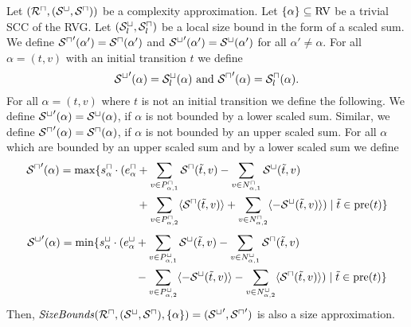 \begin{theorem}
  Let $({\mathcal{R}^\sqcap}, {({\mathcal{S}^\sqcup}, {\mathcal{S}^\sqcap})})$ be a complexity approximation.
  Let $\lbrace \alpha \rbrace \subseteq \text{RV}$ be a trivial SCC of the RVG.
  Let ${({\mathcal{S}^\sqcup_l}, {\mathcal{S}^\sqcap_l})}$ be a local size bound in the form of a scaled sum.
  We define ${\mathcal{S}^\sqcap}'(\alpha') = {\mathcal{S}^\sqcap}(\alpha')$ and ${\mathcal{S}^\sqcup}'(\alpha') = {\mathcal{S}^\sqcup}(\alpha')$ for all $\alpha' \neq \alpha$.
  For all $\alpha = (t, v)$ with an initial transition $t$ we define
  \[ {\mathcal{S}^\sqcup}'(\alpha) = {\mathcal{S}^\sqcup_l}(\alpha) \text{ and } {\mathcal{S}^\sqcap}'(\alpha) = {\mathcal{S}^\sqcap_l}(\alpha). \]
  For all $\alpha = (t, v)$ where $t$ is not an initial transition we define the following.
  We define ${\mathcal{S}^\sqcup}'(\alpha) = {\mathcal{S}^\sqcup}(\alpha)$, if $\alpha$ is not bounded by a lower scaled sum.
  Similar, we define ${\mathcal{S}^\sqcap}'(\alpha) = {\mathcal{S}^\sqcap}(\alpha)$, if $\alpha$ is not bounded by an upper scaled sum.
  For all $\alpha$ which are bounded by an upper scaled sum and by a lower scaled sum we define 
  \begin{equation}
    \begin{split}
      {\mathcal{S}^\sqcap}'(\alpha) = \max \lbrace  s^\sqcap_\alpha \cdot ( e^\sqcap_\alpha & + \sum_{v \in P_{\alpha,1}^\sqcap} {\mathcal{S}^\sqcap}(\tilde{t}, v) - \sum_{v \in N_{\alpha,1}^\sqcap} {\mathcal{S}^\sqcup}(\tilde{t}, v) \\
        & + \sum_{v \in P_{\alpha,2}^\sqcap} \langle{\mathcal{S}^\sqcap}(\tilde{t}, v)\rangle + \sum_{v \in N_{\alpha,2}^\sqcap} \langle-{\mathcal{S}^\sqcup}(\tilde{t}, v)\rangle ) \mid \tilde{t} \in \text{pre}(t) \rbrace
    \end{split}
  \end{equation}
  \begin{equation}
    \begin{split}
      {\mathcal{S}^\sqcup}'(\alpha) = \min \lbrace  s^\sqcup_\alpha \cdot ( e^\sqcup_\alpha & + \sum_{v \in P_{\alpha,1}^\sqcup} {\mathcal{S}^\sqcup}(\tilde{t}, v) - \sum_{v \in N_{\alpha,1}^\sqcup} {\mathcal{S}^\sqcap}(\tilde{t}, v) \\
        & - \sum_{v \in P_{\alpha,2}^\sqcup} \langle-{\mathcal{S}^\sqcup}(\tilde{t}, v)\rangle - \sum_{v \in N_{\alpha,2}^\sqcup} \langle{\mathcal{S}^\sqcap}(\tilde{t}, v)\rangle ) \mid \tilde{t} \in \text{pre}(t) \rbrace
    \end{split}
  \end{equation}
  Then, $\mathit{SizeBounds}({\mathcal{R}^\sqcap}, {({\mathcal{S}^\sqcup}, {\mathcal{S}^\sqcap})}, \lbrace \alpha \rbrace) = ({\mathcal{S}^\sqcup}', {\mathcal{S}^\sqcap}')$ is also a size approximation.
\end{theorem}
